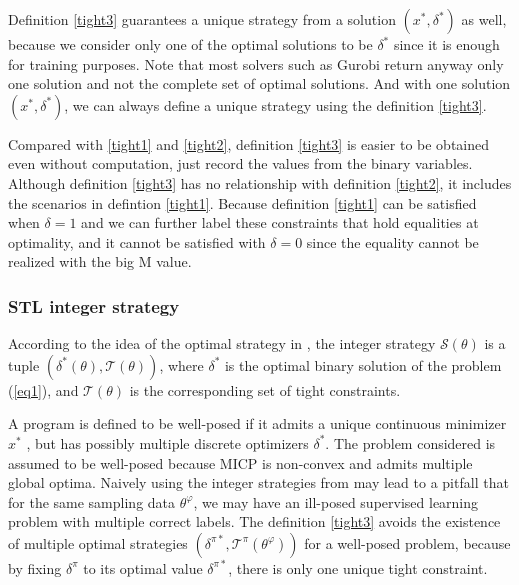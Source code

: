 \documentclass[a4paper]{report}
\begin{document}
Definition \ref{tight3} guarantees a unique strategy from a solution $(x^*,\delta^*)$ as well, because we consider only one of the optimal solutions to be $\delta^*$ since it is enough for training purposes. Note that most solvers such as Gurobi return anyway only one solution and not the complete set of optimal solutions. And with one solution $(x^*,\delta^*)$, we can always define a unique strategy using the definition \ref{tight3}.

Compared with \ref*{tight1} and \ref*{tight2}, definition \ref{tight3} is easier to be obtained even without computation, just record the values from the binary variables. Although definition \ref*{tight3} has no relationship with definition \ref*{tight2}, it includes the scenarios in defintion \ref*{tight1}. Because definition \ref*{tight1} can be satisfied when $\delta = 1$ and we can further label these constraints that hold equalities at optimality, and it cannot be satisfied with $\delta = 0$ since the equality cannot be realized with the big M value.

 
\subsubsection*{STL integer strategy}  

According to the idea of the optimal strategy in \cite{bertsimas2022online},  the integer strategy $\mathcal{S}(\theta)$ is a tuple $(\delta^*(\theta),\mathcal{T}(\theta))$, where $\delta^*$ is the optimal binary solution of the problem (\ref*{eq1}), and $\mathcal{T}(\theta)$ is the corresponding set of tight constraints.

A program is defined to be well-posed if it admits a unique continuous minimizer $x^*$ \cite{Cauligi2020}\cite{jaynes1973well}, but has possibly multiple discrete optimizers ${\delta^*}$. The problem considered is assumed to be well-posed because MICP is non-convex and admits multiple global optima. Naively using the integer strategies from \cite{bertsimas2022online}\cite{bertsimas2021voice} may lead to a pitfall that for the same sampling data $\theta^\varphi$, we may have an ill-posed supervised learning problem with multiple correct labels. The definition \ref{tight3} avoids the existence of multiple optimal strategies ${(\delta^{\pi*},\mathcal{T}^\pi(\theta^\varphi))}$ for a well-posed problem, because by fixing $\delta^\pi$ to its optimal value $\delta^{\pi*}$, there is only one unique tight constraint.
\end{document}
